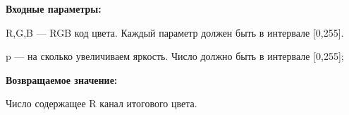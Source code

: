 \textbf{Входные параметры:}  

R,G,B --- RGB код цвета. Каждый параметр должен быть в интервале [0,255].

p --- на сколько увеличиваем яркость. Число должно быть в интервале [0,255];

\textbf{Возвращаемое значение:}

Число содержащее R канал итогового цвета.